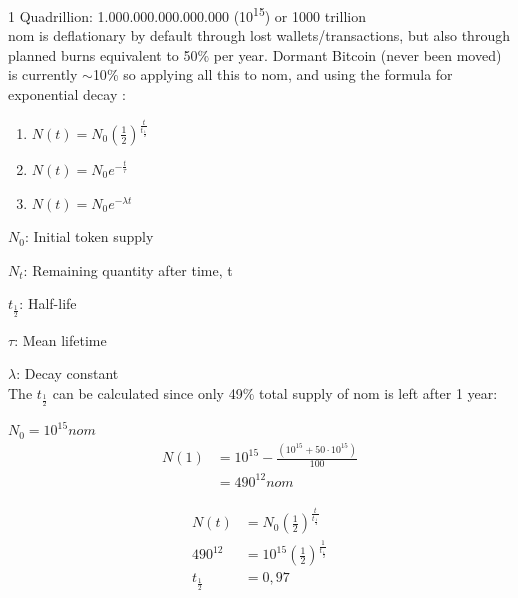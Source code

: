 \documentclass[12pt]{article}
\begin{document}
1 Quadrillion: 1.000.000.000.000.000 (10\textsuperscript{15}) or 1000 trillion \\

nom is deflationary by default through lost wallets/transactions, but also through planned burns equivalent to 50$\%$ per year. Dormant Bitcoin (never been moved) is currently $\sim$10{\%} \cite{btc} so applying all this to nom, and using the formula for exponential decay \cite{decay}: 


\begin{enumerate}[label=(\roman*)]

\item $N(t)=N_{0}(\frac{1}{2})^\frac{t}{t_{\frac{1}{2}}}$

\item  $N(t)=N_{0}e^{-\frac{t}{\tau}}$

\item  $N(t)=N_{0}e^{-\lambda t}$

\end{enumerate}

$N_{0}$: Initial token supply

$N_{t}$: Remaining quantity after time, t

${t_{\frac{1}{2}}}$: Half-life

$\tau$: Mean lifetime

$\lambda$: Decay constant\\

The ${t_{\frac{1}{2}}}$ can be calculated since only 49$\%$ total supply of nom is left after 1 year:

$N_{0} = 10^{15} nom$\\

\begin{equation}\label{init}
\begin{split}
 N(1) &= 10^{15} - \frac{(10^{15} + 50\cdot 10^{15})}{100}\\
 &= 490^{12} nom
\end{split}
\end{equation}

\begin{equation}\label{decay}
\begin{split}
N(t)&=N_{0}(\frac{1}{2})^\frac{t}{t_{\frac{1}{2}}}\\
490^{12}&=10^{15}(\frac{1}{2})^\frac{1}{t_{\frac{1}{2}}}\\
{t_{\frac{1}{2}}} & = 0,97
\end{split}
\end{equation}
\\
\end{document}
